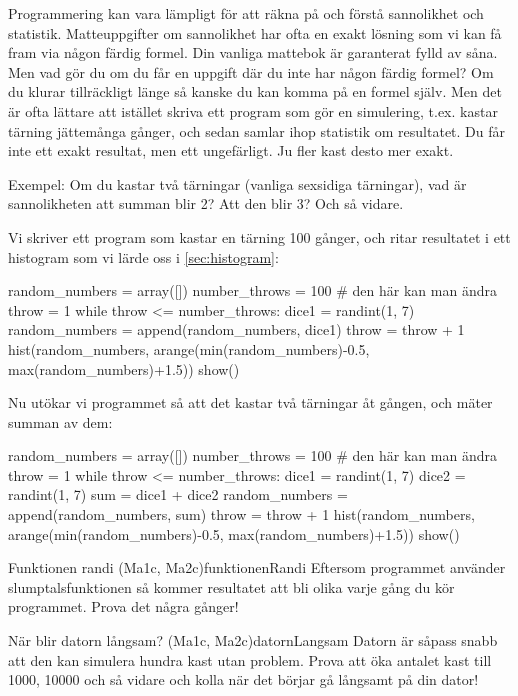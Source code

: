 Programmering kan vara lämpligt för att räkna på och förstå sannolikhet och statistik. Matteuppgifter om sannolikhet har ofta en exakt lösning som vi kan få fram via någon färdig formel. Din vanliga mattebok är garanterat fylld av såna. Men vad gör du om du får en uppgift där du inte har någon färdig formel? Om du klurar tillräckligt länge så kanske du kan komma på en formel själv. Men det är ofta lättare att istället skriva ett program som gör en simulering, t.ex. kastar tärning jättemånga gånger, och sedan samlar ihop statistik om resultatet. Du får inte ett exakt resultat, men ett ungefärligt. Ju fler kast desto mer exakt.

Exempel: Om du kastar två tärningar (vanliga sexsidiga tärningar), vad är sannolikheten att summan blir 2? Att den blir 3? Och så vidare.

Vi skriver ett program som kastar en tärning 100 gånger, och ritar resultatet i ett histogram som vi lärde oss i \autoref{sec:histogram}:
\vspace{10pt}
\begin{python}
random_numbers = array([])
number_throws = 100 # den här kan man ändra
throw = 1
while throw <= number_throws:
	dice1 = randint(1, 7)
	random_numbers = append(random_numbers, dice1)
	throw = throw + 1
hist(random_numbers, arange(min(random_numbers)-0.5, max(random_numbers)+1.5))
show()
\end{python}
\newpage
Nu utökar vi programmet så att det kastar två tärningar åt gången, och mäter summan av dem:
\vspace{10pt}
\begin{python}
random_numbers = array([])
number_throws = 100 # den här kan man ändra
throw = 1
while throw <= number_throws:
	dice1 = randint(1, 7)
	dice2 = randint(1, 7)
	sum = dice1 + dice2
	random_numbers = append(random_numbers, sum)
	throw = throw + 1
hist(random_numbers, arange(min(random_numbers)-0.5, max(random_numbers)+1.5))
show()
\end{python}



\begin{matteovning}{Funktionen randi (Ma1c, Ma2c)}{funktionenRandi}
Eftersom programmet använder slumptalsfunktionen  så kommer resultatet att bli olika varje gång du kör programmet. Prova det några gånger!
\end{matteovning}

\begin{matteovning}{När blir datorn långsam? (Ma1c, Ma2c)}{datornLangsam}
Datorn är såpass snabb att den kan simulera hundra kast utan problem. Prova att öka antalet kast till 1000, 10000 och så vidare och kolla när det börjar gå långsamt på din dator!
\end{matteovning}

